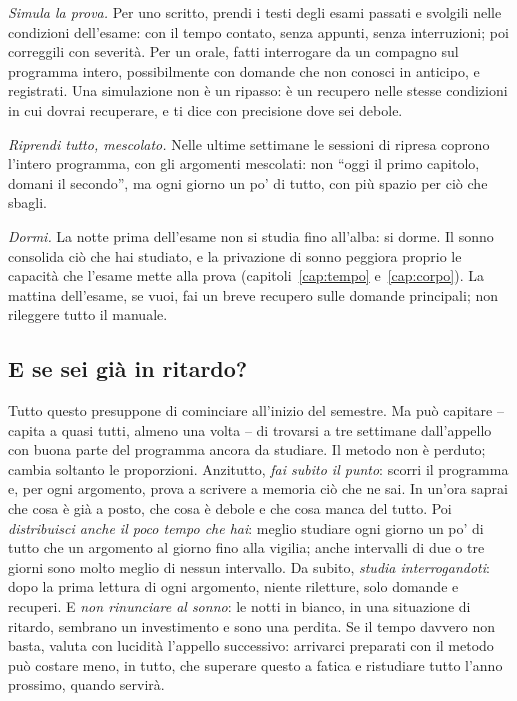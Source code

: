 \emph{Simula la prova.} Per uno scritto, prendi i testi degli esami
passati e svolgili nelle condizioni dell'esame: con il tempo contato,
senza appunti, senza interruzioni; poi correggili con severità. Per un
orale, fatti interrogare da un compagno sul programma intero,
possibilmente con domande che non conosci in anticipo, e registrati.
Una simulazione non è un ripasso: è un recupero nelle stesse
condizioni in cui dovrai recuperare, e ti dice con precisione dove sei
debole.

\emph{Riprendi tutto, mescolato.} Nelle ultime settimane le sessioni di
ripresa coprono l'intero programma, con gli argomenti mescolati: non
\enquote{oggi il primo capitolo, domani il secondo}, ma ogni giorno un
po' di tutto, con più spazio per ciò che sbagli.

\emph{Dormi.} La notte prima dell'esame non si studia fino all'alba: si
dorme. Il sonno consolida ciò che hai studiato, e la privazione di sonno
peggiora proprio le capacità che l'esame mette alla prova
(capitoli~\ref{cap:tempo} e~\ref{cap:corpo}). La mattina dell'esame,
se vuoi, fai un breve recupero sulle domande principali; non rileggere
tutto il manuale.

\subsection*{E se sei già in ritardo?}

Tutto questo presuppone di cominciare all'inizio del semestre. Ma può
capitare -- capita a quasi tutti, almeno una volta -- di trovarsi a tre
settimane dall'appello con buona parte del programma ancora da
studiare. Il metodo non è perduto; cambia soltanto le proporzioni.
Anzitutto, \emph{fai subito il punto}: scorri il programma e, per ogni
argomento, prova a scrivere a memoria ciò che ne sai. In un'ora saprai
che cosa è già a posto, che cosa è debole e che cosa manca del tutto.
Poi \emph{distribuisci anche il poco tempo che hai}: meglio studiare
ogni giorno un po' di tutto che un argomento al giorno fino alla vigilia;
anche intervalli di due o tre giorni sono molto meglio di nessun
intervallo. Da subito, \emph{studia interrogandoti}: dopo la prima
lettura di ogni argomento, niente riletture, solo domande e recuperi.
E \emph{non rinunciare al sonno}: le notti in bianco, in una situazione
di ritardo, sembrano un investimento e sono una perdita. Se il tempo
davvero non basta, valuta con lucidità l'appello successivo: arrivarci
preparati con il metodo può costare meno, in tutto, che superare
questo a fatica e ristudiare tutto l'anno prossimo, quando servirà.

